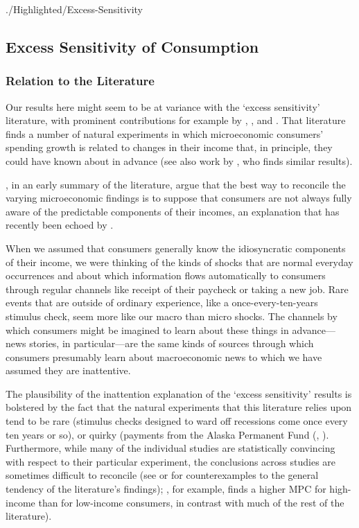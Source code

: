 \documentclass[titlepage]{\econtex}
\begin{document}
\hypertarget{Excess-Sensitivity}{} 
\begin{verbatimwrite}{./Highlighted/Excess-Sensitivity}

\subsection{Excess Sensitivity of Consumption} \label{sec:ExcessSens}

\subsubsection{Relation to the Literature}

Our results here might seem to be at variance with the `excess sensitivity' literature, with prominent contributions for example by \cite{soulelesTaxRefunds}, \cite{jpsTax}, and \cite{psjmMPC2008}.  That literature finds a number of natural experiments in which microeconomic consumers' spending growth is related to changes in their income that, in principle, they could have known about in advance (see also work by \cite{kuengTaxnews}, who finds similar results).

\cite{BrowningColladoAER}, in an early summary of the literature, argue that the best way to reconcile the varying microeconomic findings is to suppose that consumers are not always fully aware of the predictable components of their incomes, an explanation that has recently been echoed by \cite{parker25million}.

When we assumed that consumers generally know the idiosyncratic components of their income, we were thinking of the kinds of shocks that are normal everyday occurrences and about which information flows automatically to consumers through regular channels like receipt of their paycheck or taking a new job.  Rare events that are outside of ordinary experience, like a once-every-ten-years stimulus check, seem more like our macro than micro shocks.  The channels by which consumers might be imagined to learn about these things in advance---news stories, in particular---are the same kinds of sources through which consumers presumably learn about macroeconomic news to which we have assumed they are inattentive. %

The plausibility of the inattention explanation of the `excess sensitivity' results is bolstered by the fact that the natural experiments that this literature relies upon tend to be rare (stimulus checks designed to ward off recessions come once every ten years or so), or quirky (payments from the Alaska Permanent Fund (\cite{hsiehAlaska}, \cite{kuengAlaska}).  Furthermore, while many of the individual studies are statistically convincing with respect to their particular experiment, the conclusions across studies are sometimes difficult to reconcile (see \cite{hsiehAlaska} or \cite{CoulibalyLiMortgage} for counterexamples to the general tendency of the literature's findings); \cite{kuengAlaska}, for example, finds a higher MPC for high-income than for low-income consumers, in contrast with much of the rest of the literature).



\end{verbatimwrite}
\end{document}
